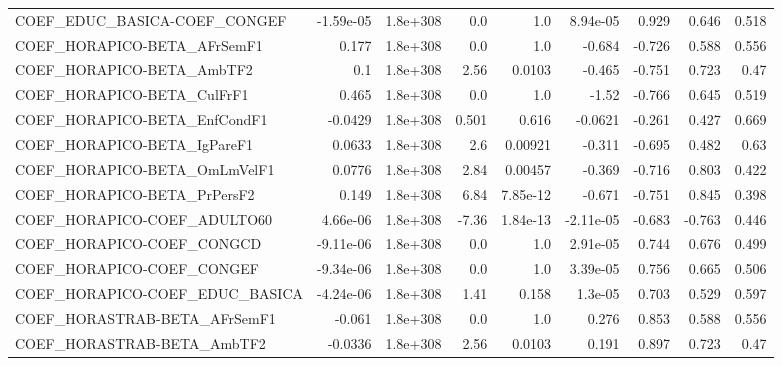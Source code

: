 \begin{tabular}{lrrrrrrrr}
COEF\_EDUC\_BASICA-COEF\_CONGEF          &   -1.59e-05 &     1.8e+308 &     0.0 &      1.0 &   8.94e-05 &       0.929 &        0.646 &         0.518 \\
COEF\_HORAPICO-BETA\_AFrSemF1           &       0.177 &     1.8e+308 &     0.0 &      1.0 &     -0.684 &      -0.726 &        0.588 &         0.556 \\
COEF\_HORAPICO-BETA\_AmbTF2             &         0.1 &     1.8e+308 &    2.56 &   0.0103 &     -0.465 &      -0.751 &        0.723 &          0.47 \\
COEF\_HORAPICO-BETA\_CulFrF1            &       0.465 &     1.8e+308 &     0.0 &      1.0 &      -1.52 &      -0.766 &        0.645 &         0.519 \\
COEF\_HORAPICO-BETA\_EnfCondF1          &     -0.0429 &     1.8e+308 &   0.501 &    0.616 &    -0.0621 &      -0.261 &        0.427 &         0.669 \\
COEF\_HORAPICO-BETA\_IgPareF1           &      0.0633 &     1.8e+308 &     2.6 &  0.00921 &     -0.311 &      -0.695 &        0.482 &          0.63 \\
COEF\_HORAPICO-BETA\_OmLmVelF1          &      0.0776 &     1.8e+308 &    2.84 &  0.00457 &     -0.369 &      -0.716 &        0.803 &         0.422 \\
COEF\_HORAPICO-BETA\_PrPersF2           &       0.149 &     1.8e+308 &    6.84 & 7.85e-12 &     -0.671 &      -0.751 &        0.845 &         0.398 \\
COEF\_HORAPICO-COEF\_ADULTO60           &    4.66e-06 &     1.8e+308 &   -7.36 & 1.84e-13 &  -2.11e-05 &      -0.683 &       -0.763 &         0.446 \\
COEF\_HORAPICO-COEF\_CONGCD             &   -9.11e-06 &     1.8e+308 &     0.0 &      1.0 &   2.91e-05 &       0.744 &        0.676 &         0.499 \\
COEF\_HORAPICO-COEF\_CONGEF             &   -9.34e-06 &     1.8e+308 &     0.0 &      1.0 &   3.39e-05 &       0.756 &        0.665 &         0.506 \\
COEF\_HORAPICO-COEF\_EDUC\_BASICA        &   -4.24e-06 &     1.8e+308 &    1.41 &    0.158 &    1.3e-05 &       0.703 &        0.529 &         0.597 \\
COEF\_HORASTRAB-BETA\_AFrSemF1          &      -0.061 &     1.8e+308 &     0.0 &      1.0 &      0.276 &       0.853 &        0.588 &         0.556 \\
COEF\_HORASTRAB-BETA\_AmbTF2            &     -0.0336 &     1.8e+308 &    2.56 &   0.0103 &      0.191 &       0.897 &        0.723 &          0.47 \\

\end{tabular}
